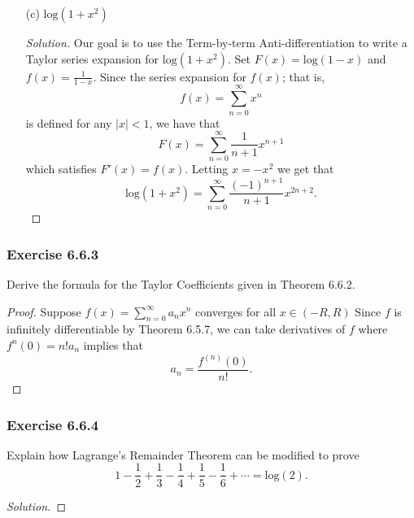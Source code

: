 \begin{enumerate}
\begin{proof}[Solution]
        Letting \( x = -4x^2  \) and multiplying by \( x  \), we arrive at the following Taylor series expansion 
        \[  \frac{ x  }{ (1 + 4x^2 )^2  } = \sum_{ n=1  }^{ \infty  } (-4)^{n-1} n  x^{2n - 1 }  \]
        which holds for all \( x \in (-R ,R ) \).
        \end{proof}
    \item[(c)] \( \text{log}(1+x^2) \)
        \begin{proof}[Solution]
            Our goal is to use the Term-by-term Anti-differentiation to write a Taylor series expansion for  \(  \text{log}(1+x^2) \). Set \( F(x) = \text{log}(1-x) \) and \( f(x) = \frac{ 1 }{ 1 - x  }  \). Since the series expansion for \( f(x)  \); that is, 
            \[  f(x) =\sum_{ n = 0  }^{ \infty  } x^n \] is defined for any \( | x  | < 1  \), we have that 
            \[  F(x) = \sum_{ n=0 }^{ \infty  } \frac{ 1 }{ n+1  } x^{n+1} \]
            which satisfies  \( F'(x) = f(x)  \). Letting \( x = - x^2  \) we get that 
            \[  \text{log}(1 + x^2 ) =  \sum_{ n=0  }^{ \infty  } \frac{ (-1)^{n+1}  }{ n+1  } x^{2n+2}.\]
        \end{proof}
\end{enumerate}






\subsubsection{Exercise 6.6.3} Derive the formula for the Taylor Coefficients given in Theorem 6.6.2.
\begin{proof}
    Suppose \( f(x) = \sum_{ n=0 }^{ \infty  } a_n x^n  \) converges for all \( x \in (-R ,R ) \) Since \( f  \) is infinitely differentiable by Theorem 6.5.7, we can take derivatives of \( f  \) where \( f^{n}(0)= n! a_n    \) implies that 
    \[  a_n = \frac{ f^{(n)}(0) }{ n! }. \]
    \[   \]
\end{proof}

\subsubsection{Exercise 6.6.4} Explain how Lagrange's Remainder Theorem can be modified to prove 
\[  1 - \frac{ 1 }{ 2 } + \frac{ 1 }{ 3 } - \frac{ 1 }{ 4 }  + \frac{ 1 }{ 5 } - \frac{ 1 }{ 6 } + \dotsb = \text{log}(2). \]
\begin{proof}[Solution]

\end{proof}

